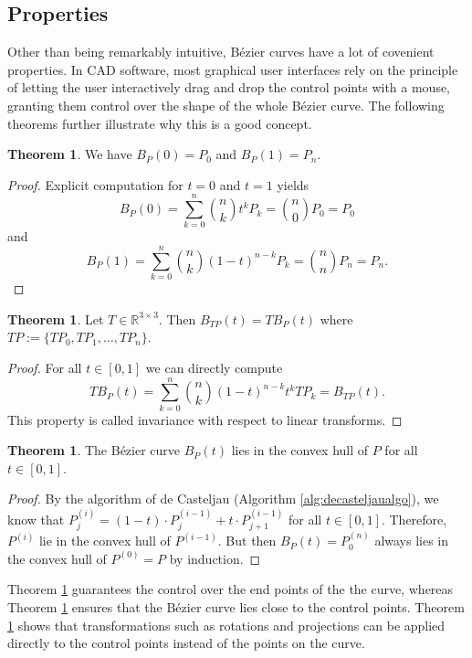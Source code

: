 \documentclass[a4paper, 11pt]{report}
\theoremstyle{definition}
\newtheorem{theorem}[definition]{Theorem}
\begin{document}
\subsection{Properties}
	Other than being remarkably intuitive, Bézier curves have a lot of covenient properties. In CAD software, most graphical user interfaces rely on the principle of letting the user interactively drag and drop the control points with a mouse, granting them control over the shape of the whole Bézier curve. The following theorems further illustrate why this is a good concept.

	\begin{theorem}\label{thm:bezierendpoints}
		We have $B_P(0) = P_0$ and $B_P(1) = P_n$.
	\end{theorem}
	\begin{proof}
		Explicit computation for $t=0$ and $t=1$ yields
			$$B_P(0) = \sum_{k=0}^n \binom{n}{k} t^k P_k = \binom{n}{0} P_0 = P_0$$
		and
			$$B_P(1) = \sum_{k=0}^n \binom{n}{k} (1-t)^{n-k} P_k = \binom{n}{n} P_n = P_n.$$
	\end{proof}

	\begin{theorem}\label{thm:bezieraffinetransform}
		Let $T \in \mathbb{R}^{3 \times 3}$. Then $B_{TP}(t) = TB_P(t)$ where $TP := \{TP_0, TP_1, \ldots, TP_n\}$.
	\end{theorem}
	\begin{proof}
		For all $t \in [0, 1]$ we can directly compute
			$$TB_P(t) = \sum_{k=0}^n \binom{n}{k} (1-t)^{n-k}t^k TP_k = B_{TP}(t).$$
		This property is called invariance with respect to linear transforms.
	\end{proof}

	\begin{theorem}\label{thm:bezierconvexhull}
		The Bézier curve $B_P(t)$ lies in the convex hull of $P$ for all $t \in [0,1]$.
	\end{theorem}
	\begin{proof}
		By the algorithm of de Casteljau (Algorithm \ref{alg:decasteljaualgo}), we know that $P^{(i)}_j = (1-t) \cdot P^{(i-1)}_j + t \cdot P^{(i-1)}_{j+1}$ for all $t \in [0, 1]$. Therefore, $P^{(i)}$ lie in the convex hull of $P^{(i-1)}$. But then $B_P(t) = P^{(n)}_0$ always lies in the convex hull of $P^{(0)} = P$ by induction.
	\end{proof}

	Theorem \ref{thm:bezierendpoints} guarantees the control over the end points of the the curve, whereas Theorem \ref{thm:bezierconvexhull} ensures that the Bézier curve lies close to the control points. Theorem \ref{thm:bezieraffinetransform} shows that transformations such as rotations and projections can be applied directly to the control points instead of the points on the curve.
\end{document}
